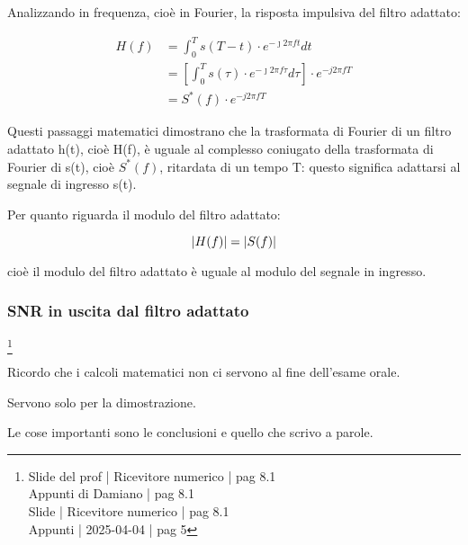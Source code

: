 Analizzando in frequenza, cioè in Fourier, la risposta impulsiva del filtro adattato: 

{
    \Large 
    \begin{equation}
        \begin{split}
            H (f)
            &=
            \int_{0}^{T}
            s(T - t) \cdot e^{- \jmath 2 \pi f t} dt
            \\
            &= 
            \left[ 
                \int_{0}^{T}
                s(\tau) \cdot e^{-\jmath 2 \pi f \tau} d\tau
            \right]
            \cdot 
            e^{-j 2 \pi f T} 
            \\
            &= 
            S^{*} (f) \cdot e^{-j 2 \pi f T} 
        \end{split}
    \end{equation}
}

Questi passaggi matematici dimostrano che la trasformata di Fourier di un filtro adattato h(t), cioè H(f), 
è uguale al complesso coniugato della trasformata di Fourier di s(t), cioè $S^{*}(f)$, 
ritardata di un tempo T: 
questo significa adattarsi al segnale di ingresso s(t). \newline 

Per quanto riguarda il modulo del filtro adattato: 

{
    \Large 
    \begin{equation}
        \abs{H (f)} = \abs{S(f)}
    \end{equation}
}

cioè il modulo del filtro adattato è uguale al modulo del segnale in ingresso. \newline 

\newpage 

\subsubsection{SNR in uscita dal filtro adattato}
\footnote{Slide del prof | Ricevitore numerico | pag 8.1 \\  
Appunti di Damiano | pag 8.1 \\
Slide | Ricevitore numerico | pag 8.1 \\
Appunti | 2025-04-04 | pag 5
}

\begin{tcolorbox}
    Ricordo che i calcoli matematici non ci servono al fine dell'esame orale. \newline 

    Servono solo per la dimostrazione. \newline 

    Le cose importanti sono le conclusioni e quello che scrivo a parole.
\end{tcolorbox}


